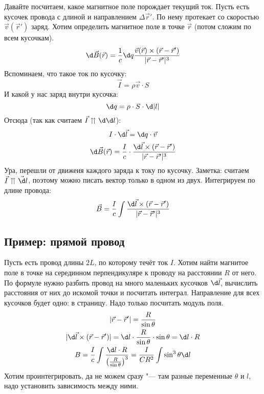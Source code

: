   Давайте посчитаем, какое магнитное поле порождает текущий ток.
  Пусть есть кусочек провода с длиной и направлением $\Delta \vec r'$.
  По нему протекает со скоростью $\vec v(\vec r')$ заряд.
  Хотим определить магнитное поле в точке $\vec r$ (потом сложим по всем кусочкам).
  \[ \d \vec B(\vec r) = \frac 1 c \d q \frac{\vec v(\vec r) \times (\vec r - \vec r')}{|\vec r - \vec r'|^3}\]
  Вспоминаем, что такое ток по кусочку:
  \[ \vec I = \rho \vec v \cdot S \]
  И какой у нас заряд внутри кусочка:
  \[ \d q = \rho \cdot S \cdot \d |l|\]
  Отсюда (так как считаем $\vec I \upuparrows \d \d l$):
  \begin{gather*}
    I \cdot \d \vec l = \d q \cdot \vec v \\
    \d \vec B(\vec r) = \frac I c \cdot \frac{\d \vec l \times (\vec r - \vec r')}{|\vec r - \vec r'|^3}
  \end{gather*}
  Ура, перешли от движеия каждого заряда к току по кусочку.
  Заметка: считаем $\vec I \upuparrows \vec \d l$, поэтому можно писать вектор только в одном из двух.
  Интегрируем по длине провода:
  \[
    \vec B = \frac I c \int \frac{\d \vec l \times (\vec r - \vec r')}{|\vec r - \vec r'|^3}
  \]

  \subsection{Пример: прямой провод}
  Пусть есть провод длины $2L$, по которому течёт ток $I$.
  Хотим найти магнитое поле в точке на серединном перпендикуляре к проводу на расстоянии $R$ от него.
  По формуле нужно разбить провод на много маленьких кусочков $\d \vec l$,
  вычислить расстояния от них до искомой точки и посчитать интеграл.
  Направление для всех кусочков будет одно: в страницу.
  Надо только посчитать модуль поля.
  \begin{gather*}
  | \vec r - \vec r' | = \frac R{\sin \theta} \\
  | \d \vec l \times (\vec r - \vec r') | = \d l \cdot \frac{R}{\sin \theta} \cdot \sin \theta = \d l \cdot R \\
  B = \frac I c \int \frac{\d l \cdot R}{\left(\frac R{\sin \theta}\right)^3}
    = \frac I {CR^2} \int \sin^3 \theta \d l
  \end{gather*}
  Хотим проинтегрировать, да не можем сразу "--- там разные переменные $\theta$ и $l$, надо установить зависимость между ними.
  
